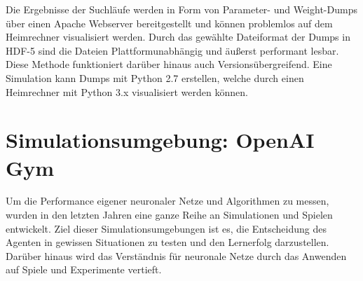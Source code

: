 	Die Ergebnisse der Suchläufe werden in Form von Parameter- und Weight-Dumps über einen Apache Webserver bereitgestellt und können problemlos auf dem Heimrechner visualisiert werden. Durch das gewählte Dateiformat der Dumps in HDF-5 \cite{hdf5} sind die Dateien Plattformunabhängig und äußerst performant lesbar. Diese Methode funktioniert darüber hinaus auch Versionsübergreifend. Eine Simulation kann Dumps mit Python 2.7 erstellen, welche durch einen Heimrechner mit Python 3.x visualisiert werden können.

\section{Simulationsumgebung: OpenAI Gym}
\label{sec:imp_sim}
	Um die Performance eigener neuronaler Netze und Algorithmen zu messen, wurden in den letzten Jahren eine ganze Reihe an Simulationen und Spielen entwickelt. Ziel dieser Simulationsumgebungen ist es, die Entscheidung des Agenten in gewissen Situationen zu testen und den Lernerfolg darzustellen. Darüber hinaus wird das Verständnis für neuronale Netze durch das Anwenden auf Spiele und Experimente vertieft.
	
